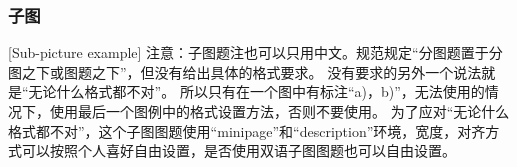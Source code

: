 \begin{figure}[htbp]
\begin{minipage}[t]{0.4\textwidth}
\end{minipage}
\end{figure}

\subsubsection{子图}[Sub-picture example]
注意：子图题注也可以只用中文。规范规定“分图题置于分图之下或图题之下”，但没有给出具体的格式要求。
没有要求的另外一个说法就是“无论什么格式都不对”。
所以只有在一个图中有标注“a)，b)”，无法使用的情况下，使用最后一个图例中的格式设置方法，否则不要使用。
为了应对“无论什么格式都不对”，这个子图图题使用“minipage”和“description”环境，宽度，对齐方式可以按照个人喜好自由设置，是否使用双语子图图题也可以自由设置。

